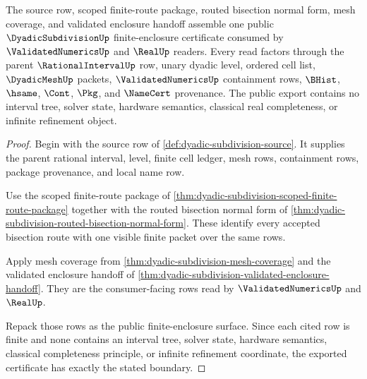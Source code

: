 \begin{theorem}
\label{thm:dyadic-subdivision-public-finite-enclosure-export}
The source row, scoped finite-route package, routed bisection normal form, mesh coverage, and validated enclosure handoff assemble one public $\DyadicSubdivisionUp$ finite-enclosure certificate consumed by $\ValidatedNumericsUp$ and $\RealUp$ readers. Every read factors through the parent $\RationalIntervalUp$ row, unary dyadic level, ordered cell list, $\DyadicMeshUp$ packets, $\ValidatedNumericsUp$ containment rows, $\BHist$, $\hsame$, $\Cont$, $\Pkg$, and $\NameCert$ provenance. The public export contains no interval tree, solver state, hardware semantics, classical real completeness, or infinite refinement object.
\end{theorem}
\begin{proof}
Begin with the source row of \autoref{def:dyadic-subdivision-source}. It supplies the parent rational interval, level, finite cell ledger, mesh rows, containment rows, package provenance, and local name row.

Use the scoped finite-route package of \autoref{thm:dyadic-subdivision-scoped-finite-route-package} together with the routed bisection normal form of \autoref{thm:dyadic-subdivision-routed-bisection-normal-form}. These identify every accepted bisection route with one visible finite packet over the same rows.

Apply mesh coverage from \autoref{thm:dyadic-subdivision-mesh-coverage} and the validated enclosure handoff of \autoref{thm:dyadic-subdivision-validated-enclosure-handoff}. They are the consumer-facing rows read by $\ValidatedNumericsUp$ and $\RealUp$.

Repack those rows as the public finite-enclosure surface. Since each cited row is finite and none contains an interval tree, solver state, hardware semantics, classical completeness principle, or infinite refinement coordinate, the exported certificate has exactly the stated boundary.
\end{proof}

